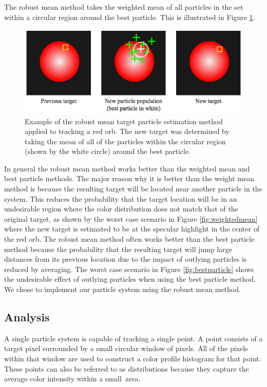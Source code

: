\documentclass[11pt]{article}
\begin{document}
The robust mean method takes the weighted mean of all particles in the set within a circular region around the best particle. This is illustrated in Figure \ref{fig:robustmean}.

\begin{figure}[H]
\centering
\includegraphics[scale=.55]{img/robustmean.jpg}
\caption{Example of the robust mean target particle estimation method applied to tracking a red orb. The new target was determined by taking the mean of all of the particles within the circular region (shown by the white circle) around the best particle.}
\label{fig:robustmean}
\end{figure}

In general the robust mean method works better than the weighted mean and best particle methods. The major reason why it is better than the weight mean method  is because the resulting target will be located near another particle in the system. This reduces the probability that the target location will be in an undesirable region where the color distribution does not match that of the original target, as shown by the worst case scenario in Figure \ref{fig:weightedmean} where the new target is estimated to be at the specular highlight in the center of the red orb. The robust mean method often works better than the best particle method because the probability that the resulting target will jump large distances from its previous location due to the impact of outlying particles is reduced by averaging. The worst case scenario in Figure \ref{fig:bestparticle} shows the undesirable effect of outlying particles when using the best particle method. We chose to implement our particle system using the robust mean method.



\subsection{Analysis}

A single particle system is capable of tracking a single point. A point consists of a target pixel surrounded by a small circular window of pixels. All of the pixels within that window are used to construct a color profile histogram for that point. These points can also be referred to as distributions because they capture the average color intensity within a small~area.
\end{document}
